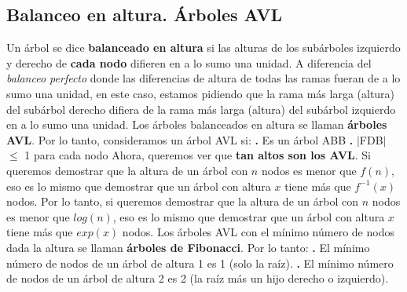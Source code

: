 \documentclass[10pt,a4paper]{article}
\begin{document}
\subsection{Balanceo en altura. Árboles AVL}

Un árbol se dice \textbf{balanceado en altura} si las alturas de los subárboles izquierdo y derecho de \textbf{cada nodo} difieren en a lo sumo una unidad.
\newline
\newline
A diferencia del \textit{balanceo perfecto} donde las diferencias de altura de todas las ramas fueran de a lo sumo una unidad, en este caso, estamos pidiendo que la rama más larga (altura) del subárbol derecho difiera de la rama más larga (altura) del subárbol izquierdo en a lo sumo una unidad. 
\newline
\newline
Los árboles balanceados en altura se llaman \textbf{árboles AVL}.
\newline
\newline
Por lo tanto, consideramos un árbol AVL si:
\newline
\newline
\textbf{.} Es un árbol ABB
\newline
\newline
\textbf{.} $|$FDB$|$ $\leq$ 1 para cada nodo
\newline
\newline
Ahora, queremos ver que \textbf{tan altos son los AVL}.
\newline
\newline
Si queremos demostrar que la altura de un árbol con $n$ nodos es menor que $f(n)$, eso es lo mismo que demostrar que un árbol con altura $x$ tiene más que $f^{-1}(x)$ nodos.
\newline
\newline
Por lo tanto, si queremos demostrar que la altura de un árbol con $n$ nodos es menor que $log(n)$, eso es lo mismo que demostrar que un árbol con altura $x$ tiene más que $exp(x)$ nodos. 
\newline
\newline
Los árboles AVL con el mínimo número de nodos dada la altura se llaman \textbf{árboles de Fibonacci}. Por lo tanto:
\newline
\newline
\textbf{.} El mínimo número de nodos de un árbol de altura 1 es 1 (solo la raíz).
\newline
\newline
\textbf{.} El mínimo número de nodos de un árbol de altura 2 es 2 (la raíz más un hijo derecho o izquierdo).
\end{document}

